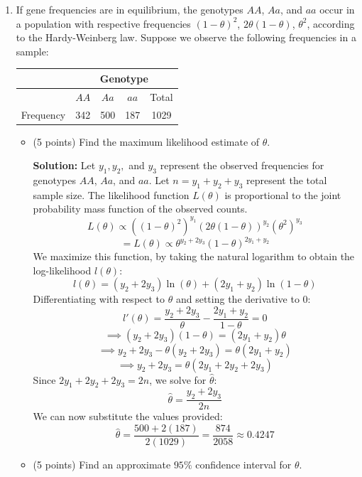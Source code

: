 \documentclass[12pt,letterpaper]{article}
\begin{document}
\begin{enumerate}[leftmargin=*]
\item If gene frequencies are in equilibrium, the genotypes $AA$, $Aa$, and $aa$ occur in a population with respective frequencies $(1-\theta)^2$, $2\theta(1-\theta)$, $\theta^2$, according to the Hardy-Weinberg law. Suppose we observe the following frequencies in a sample:
\begin{center}
\begin{tabular}{|c|c|c|c|c|}
\hline
& \multicolumn{4}{|c|}{Genotype} \\
\hline
 & $AA$ & $Aa$ & $aa$ & Total \\
\hline
Frequency & 342 & 500 & 187 & 1029 \\
\hline
\end{tabular}
\end{center}
\begin{itemize}
	\item[(a)] (5 points) Find the maximum likelihood estimate of $\theta$.
 
 \textbf{Solution:}
 Let $y_1, y_2,$ and $y_3$ represent the observed frequencies for genotypes $AA$, $Aa$, and $aa$. Let $n = y_1 + y_2 + y_3$ represent the total sample size. 
 The likelihood function $L(\theta)$ is proportional to the joint probability mass function of the observed counts.
 \[ L(\theta) \propto \left( (1-\theta)^2 \right)^{y_1} \left( 2\theta(1-\theta) \right)^{y_2} \left( \theta^2 \right)^{y_3} \]
 \[= L(\theta) \propto \theta^{y_2 + 2y_3} (1-\theta)^{2y_1 + y_2} \]
 We maximize this function, by taking the natural logarithm to obtain the log-likelihood $l(\theta)$:
 \[ l(\theta) = (y_2 + 2y_3) \ln(\theta) + (2y_1 + y_2) \ln(1-\theta) \]
 Differentiating with respect to $\theta$ and setting the derivative to 0:
 \[ l'(\theta) = \frac{y_2 + 2y_3}{\theta} - \frac{2y_1 + y_2}{1-\theta} = 0 \]
 \[\implies (y_2 + 2y_3)(1-\theta) = (2y_1 + y_2)\theta \]
 \[\implies y_2 + 2y_3 - \theta(y_2 + 2y_3) = \theta(2y_1 + y_2) \]
 \[\implies y_2 + 2y_3 = \theta(2y_1 + 2y_2 + 2y_3) \]
 Since $2y_1 + 2y_2 + 2y_3 = 2n$, we solve for $\hat{\theta}$:
 \[ \hat{\theta} = \frac{y_2 + 2y_3}{2n} \]
 We can now substitute the values provided:
 \[ \hat{\theta} = \frac{500 + 2(187)}{2(1029)} = \frac{874}{2058} \approx 0.4247 \]

	\item[(b)] (5 points) Find an approximate $95\%$ confidence interval for $\theta$.
 

\end{itemize}
\end{enumerate}
\end{document}
